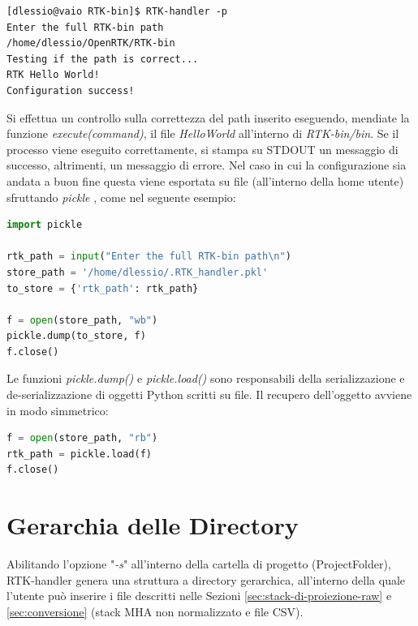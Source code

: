 \documentclass[a4paper,12pt, doubleside]{report}
\begin{document}
                \begin{lstlisting}[frame=bt]
[dlessio@vaio RTK-bin]$ RTK-handler -p
Enter the full RTK-bin path
/home/dlessio/OpenRTK/RTK-bin
Testing if the path is correct...
RTK Hello World!
Configuration success!
                \end{lstlisting}
            
                Si effettua un controllo sulla correttezza del path inserito eseguendo, mendiate la funzione \textit{execute(command)}, il file \textit{HelloWorld} all'interno di \textit{RTK-bin/bin}. Se il processo viene eseguito correttamente, si stampa su STDOUT un messaggio di successo, altrimenti, un messaggio di errore. Nel caso in cui la configurazione sia andata a buon fine questa viene esportata su file (all'interno della home utente) sfruttando \textit{pickle} \cite{python-pickle}, come nel seguente esempio:
                
                \begin{lstlisting}[language=python, frame=bt]
import pickle

rtk_path = input("Enter the full RTK-bin path\n")
store_path = '/home/dlessio/.RTK_handler.pkl'
to_store = {'rtk_path': rtk_path}

f = open(store_path, "wb")
pickle.dump(to_store, f)
f.close()
                \end{lstlisting}
                
                Le funzioni \textit{pickle.dump()} \cite{pkl-dump} e \textit{pickle.load()} \cite{pkl-load} sono responsabili della serializzazione e de-serializzazione di oggetti Python scritti su file. Il recupero dell'oggetto avviene in modo simmetrico:
                
                \begin{lstlisting}[language=python, frame=bt]  
f = open(store_path, "rb")
rtk_path = pickle.load(f)
f.close()
                \end{lstlisting}
                
        \section{Gerarchia delle Directory}
        \label{sec:architettura-directory}
            \par
                Abilitando l'opzione "\textit{-s}" all'interno della cartella di progetto (ProjectFolder), RTK-handler genera una struttura a directory gerarchica, all'interno della quale l'utente può inserire i file descritti nelle Sezioni \ref{sec:stack-di-proiezione-raw} e \ref{sec:conversione} (stack MHA non normalizzato e file CSV).
               
\end{document}
